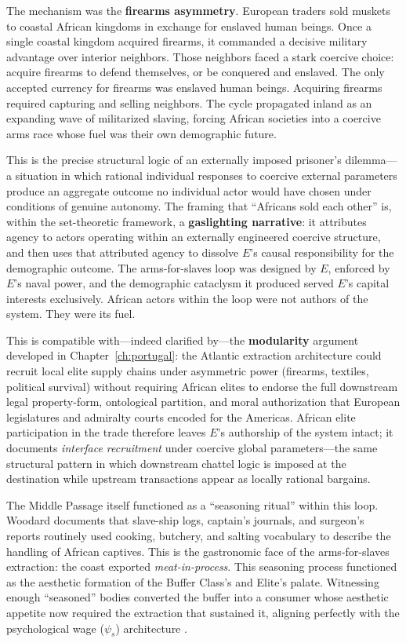 The mechanism was the \textbf{firearms asymmetry}. European traders sold muskets to coastal African kingdoms in exchange for enslaved human beings. Once a single coastal kingdom acquired firearms, it commanded a decisive military advantage over interior neighbors. Those neighbors faced a stark coercive choice: acquire firearms to defend themselves, or be conquered and enslaved. The only accepted currency for firearms was enslaved human beings. Acquiring firearms required capturing and selling neighbors. The cycle propagated inland as an expanding wave of militarized slaving, forcing African societies into a coercive arms race whose fuel was their own demographic future.

This is the precise structural logic of an externally imposed prisoner's dilemma---a situation in which rational individual responses to coercive external parameters produce an aggregate outcome no individual actor would have chosen under conditions of genuine autonomy. The framing that ``Africans sold each other'' is, within the set-theoretic framework, a \textbf{gaslighting narrative}: it attributes agency to actors operating within an externally engineered coercive structure, and then uses that attributed agency to dissolve $E$'s causal responsibility for the demographic outcome. The arms-for-slaves loop was designed by $E$, enforced by $E$'s naval power, and the demographic cataclysm it produced served $E$'s capital interests exclusively. African actors within the loop were not authors of the system. They were its fuel.

This is compatible with---indeed clarified by---the \textbf{modularity} argument developed in Chapter~\ref{ch:portugal}: the Atlantic extraction architecture could recruit local elite supply chains under asymmetric power (firearms, textiles, political survival) without requiring African elites to endorse the full downstream legal property-form, ontological partition, and moral authorization that European legislatures and admiralty courts encoded for the Americas. African elite participation in the trade therefore leaves $E$'s authorship of the system intact; it documents \textit{interface recruitment} under coercive global parameters---the same structural pattern in which downstream chattel logic is imposed at the destination while upstream transactions appear as locally rational bargains.

The Middle Passage itself functioned as a ``seasoning ritual'' within this loop. Woodard documents that slave-ship logs, captain's journals, and surgeon's reports routinely used cooking, butchery, and salting vocabulary to describe the handling of African captives. This is the gastronomic face of the arms-for-slaves extraction: the coast exported \textit{meat-in-process}. This seasoning process functioned as the aesthetic formation of the Buffer Class's and Elite's palate. Witnessing enough ``seasoned'' bodies converted the buffer into a consumer whose aesthetic appetite now required the extraction that sustained it, aligning perfectly with the psychological wage ($\psi_s$) architecture \cite{woodard_delectable}.


